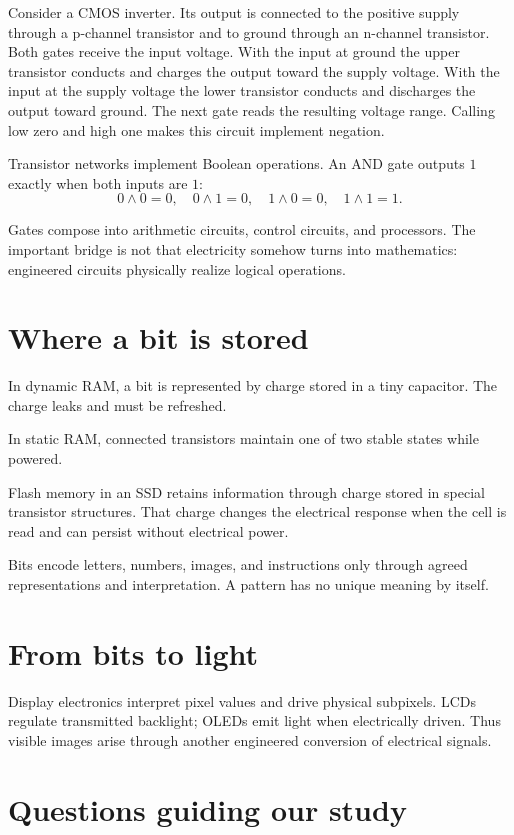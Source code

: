 Consider a CMOS inverter. Its output is
connected to the positive supply through
a p-channel transistor and to ground
through an n-channel transistor. Both
gates receive the input voltage. With
the input at ground the upper transistor
conducts and charges the output toward
the supply voltage. With the input at
the supply voltage the lower transistor
conducts and discharges the output toward
ground. The next gate reads the resulting
voltage range. Calling low zero and high
one makes this circuit implement negation.

Transistor networks implement Boolean
operations. An AND gate outputs $1$
exactly when both inputs are $1$:
$$
0\land0=0,\quad 0\land1=0,
\quad 1\land0=0,\quad 1\land1=1.
$$

Gates compose into arithmetic circuits,
control circuits, and processors.
The important bridge is not that
electricity somehow turns into
mathematics: engineered circuits
physically realize logical operations.

\section{Where a bit is stored}

In dynamic RAM, a bit is represented
by charge stored in a tiny capacitor.
The charge leaks and must be refreshed.

In static RAM, connected transistors
maintain one of two stable states
while powered.

Flash memory in an SSD retains
information through charge stored in
special transistor structures. That
charge changes the electrical response
when the cell is read and can persist
without electrical power.

Bits encode letters, numbers, images,
and instructions only through agreed
representations and interpretation.
A pattern has no unique meaning by
itself.

\section{From bits to light}

Display electronics interpret pixel
values and drive physical subpixels.
LCDs regulate transmitted backlight;
OLEDs emit light when electrically
driven. Thus visible images arise
through another engineered conversion
of electrical signals.

\section{Questions guiding our study}

